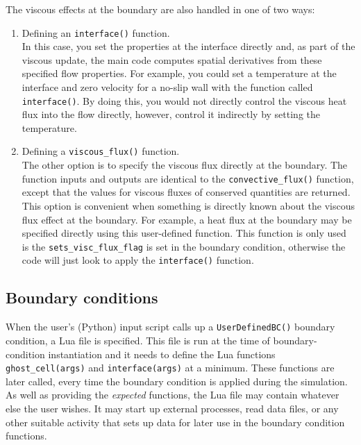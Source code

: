 The viscous effects at the boundary are also handled in one of two ways:
\begin{enumerate}
 \item Defining an \verb!interface()! function.\\
  In this case, you set the properties at the interface directly
  and, as part of the viscous update, the main code computes spatial derivatives from these specified
  flow properties. 
  For example, you could set a temperature at the interface and zero velocity for a no-slip wall
  with the function called \verb!interface()!. 
  By doing this, you would not directly control the viscous heat flux into the flow directly, 
  however, control it indirectly by setting the temperature.
 \item Defining a \verb!viscous_flux()! function. \\
  The other option is to specify the viscous flux directly at the boundary.
  The function inputs and outputs are identical to the \verb!convective_flux()! function,
  except that the values for viscous fluxes of conserved quantities are returned.
  This option is convenient when something is directly known about the viscous
  flux effect at the boundary.
  For example, a heat flux at the boundary may be specified directly using this
  user-defined function.
  This function is only used is the \verb!sets_visc_flux_flag! is set in the boundary condition,
  otherwise the code will just look to apply the \verb!interface()! function.
\end{enumerate}

\subsection{Boundary conditions}
%
When the user's (Python) input script calls up a \texttt{UserDefinedBC()} boundary condition,
a Lua file is specified.
This file is run at the time of boundary-condition instantiation and it needs to define the
Lua functions \texttt{ghost\_cell(args)} and \texttt{interface(args)} at a minimum.
These functions are later called, every time the boundary condition is applied during the simulation.
As well as providing the \textit{expected} functions, the Lua file may contain whatever else
the user wishes.
It may start up external processes, read data files, or any other suitable activity that
sets up data for later use in the boundary condition functions.


